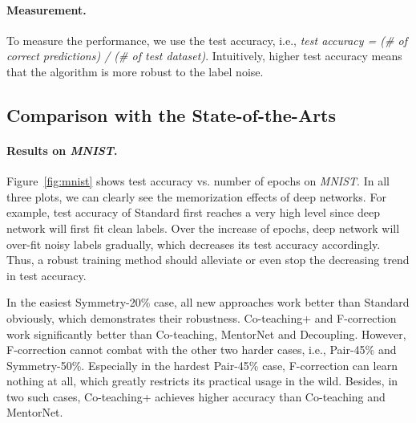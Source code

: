 \documentclass{article}
\begin{document}
\paragraph{Measurement.}
To measure the performance,
we use the test accuracy,
i.e.,
\textit{test accuracy = (\# of correct predictions) / (\# of test dataset)}. Intuitively, higher test accuracy means that the algorithm is more robust to the label noise.


\subsection{Comparison with the State-of-the-Arts}\label{sec:comp}

\begin{figure*}[ht]
\centering{}
\caption{Test accuracy vs. number of epochs on \textit{MNIST} dataset.
    }
\label{fig:mnist}
\end{figure*}

\paragraph{Results on \textit{MNIST}.} Figure~\ref{fig:mnist} shows
test accuracy vs. number of epochs on \textit{MNIST}.
In all three plots, we can clearly see the memorization effects of deep networks. For example, test accuracy of Standard first reaches a very high level since deep network will first fit clean labels. Over the increase of epochs, deep network will over-fit noisy labels gradually, which decreases its test accuracy accordingly. Thus, a robust training method should alleviate or even stop the decreasing trend in test accuracy.

In the easiest Symmetry-20\% case, all new approaches work better than Standard obviously, which demonstrates their robustness. Co-teaching+ and \mbox{F-correction} work significantly better than Co-teaching, MentorNet and Decoupling. However, F-correction cannot combat with the other two harder cases, i.e., Pair-45\% and Symmetry-50\%. Especially in the hardest Pair-45\% case, F-correction can learn nothing at all, which greatly restricts its practical usage in the wild. Besides, in two such cases, Co-teaching+ achieves higher accuracy than Co-teaching and MentorNet.
\end{document}
